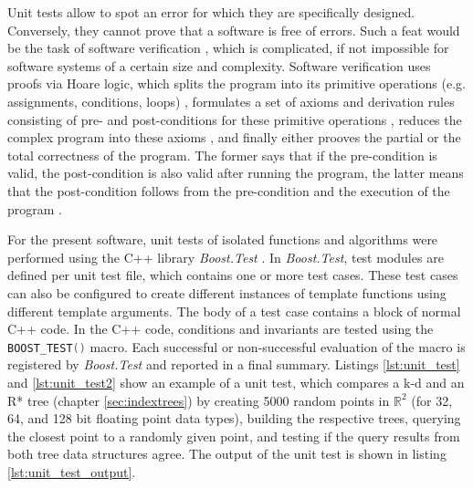Unit tests allow to spot an error for which they are specifically designed. Conversely, they cannot 
prove that a software is free of errors. Such a feat would be the task of software
verification \cite[Ch. 5, pp. 117-144]{Berghammer2017}, which is complicated, if not impossible for
software systems of a certain size and complexity.
Software verification uses proofs via Hoare logic, which splits the program into its primitive
operations (e.g. assignments, conditions, loops) \cite[pp. 118-119]{Berghammer2017}, formulates
a set of axioms and derivation rules consisting of pre- and post-conditions for these primitive operations
\cite[pp. 122]{Berghammer2017}, reduces the complex program into these axioms \cite[pp. 123]{Berghammer2017},
and finally either prooves the partial or the total correctness of the program.
The former says that if the pre-condition is valid, the post-condition is also valid after running the
program, the latter means that the post-condition follows from the pre-condition and the execution
of the program \cite[pp. 121]{Berghammer2017}.

For the present software, unit tests of isolated functions and algorithms were performed using the 
C++ library \textit{Boost.Test} \cite{web_boost_test}.
In \textit{Boost.Test}, test modules are defined per unit test file, which contains one or more test cases.
These test cases can also be configured to create different instances of template functions using
different template arguments. The body of a test case contains a block of normal C++ code.
In the C++ code, conditions and invariants are tested using the 
\lstinline[language=C++]|BOOST_TEST()| macro. Each successful or non-successful evaluation
of the macro is registered by \textit{Boost.Test} and reported in a final summary.
Listings \ref{lst:unit_test} and \ref{lst:unit_test2} show an example of a unit test, which compares
a k-d and an R* tree (chapter \ref{sec:indextrees}) by creating 5000 random points in $\mathbb{R}^2$
(for 32, 64, and 128 bit floating point data types), 
building the respective trees, querying the closest point to a randomly given point, 
and testing if the query results from both tree data structures agree. 
The output of the unit test is shown in listing \ref{lst:unit_test_output}.

